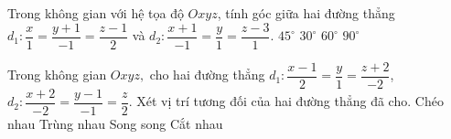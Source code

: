 \begin{ex}%
	Trong không gian với hệ tọa độ $Oxyz$, tính góc giữa hai đường thẳng $d_1\colon\dfrac{x}{1}=\dfrac{y+1}{-1}=\dfrac{z-1}{2}$ và $d_2\colon\dfrac{x+1}{-1}=\dfrac{y}{1}=\dfrac{z-3}{1}$.
	\choice
	{$45^\circ $}
	{$30^\circ $}
	{$60^\circ $}
	{\True $90^\circ $}
\end{ex}

\begin{ex}%
	Trong không gian $Oxyz,$ cho hai đường thẳng $d_1\colon \dfrac{x-1}{2}=\dfrac{y}{1}=\dfrac{z+2}{-2}$, $d_2\colon \dfrac{x+2}{-2}=\dfrac{y-1}{-1}=\dfrac{z}{2}$. Xét vị trí tương đối của hai đường thẳng đã cho.
	\choice
	{Chéo nhau}
	{Trùng nhau}
	{\True Song song}
	{Cắt nhau}
\end{ex}

